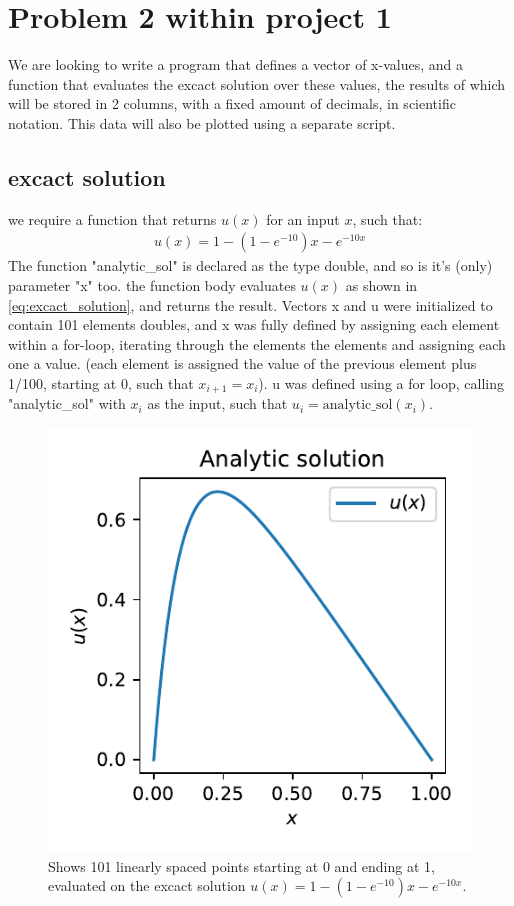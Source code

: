\documentclass{article}
\begin{document}
\section{Problem 2 within project 1}
We are looking to write a program that defines a vector of x-values, and a function that evaluates the excact solution over these values, the results of which
will be stored in 2 columns, with a fixed amount of decimals, in scientific notation. This data will also be plotted  using a separate script.
\subsection*{excact solution}
we require a function that returns $u(x)$ for an input $x$, such that:
\begin{align}    
    \label{eq:excact_solution}
    u(x) =  1 - (1-e^{-10})x - e^{-10x}
\end{align}
The function "analytic\_sol" is declared as the type double, and so is it's (only) parameter "x" too. the function body evaluates $u(x)$ as shown in \ref{eq:excact_solution}, and returns the
result. Vectors x and u were initialized to contain 101 elements doubles, and x was fully defined by assigning each element within a for-loop, iterating through the elements the elements and
assigning each one a value. (each element is assigned the value of the previous element plus 1/100, starting at 0, such that $x_{i+1} = x_i$). u was defined using a for loop, 
calling "analytic\_sol" with $x_i$ as the input, such that $u_{i} = \text{analytic\_sol}(x_i)$.


\begin{figure}
    \includegraphics{problem_2_fig.pdf}
    \caption{Shows 101 linearly spaced points starting at 0 and ending at 1, evaluated on the excact solution $u(x)=1 - (1 - e^{-10})x - e^{-10x}$.}
\end{figure}
\end{document}
